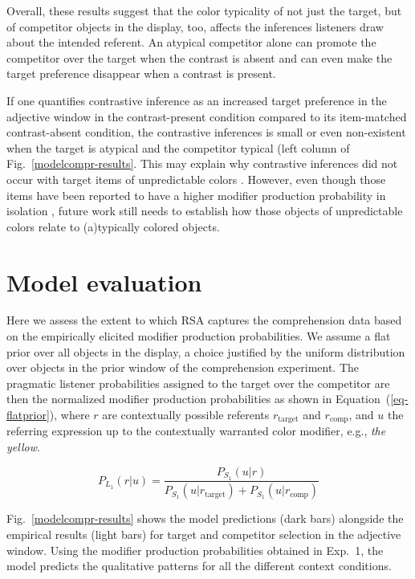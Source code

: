 \documentclass[10pt,letterpaper]{article}
\newcommand{\figref}[1]{Fig.~\ref{#1}}
\begin{document}
Overall, these results suggest that the color typicality of not just the target, but of competitor objects in the display, too, affects the inferences listeners draw about the intended referent. An atypical competitor alone can promote the competitor over the target when the contrast is absent and can even make the target preference disappear when a contrast is present. %

If one quantifies contrastive inference as an increased target preference in the adjective window in the contrast-present condition compared to its item-matched contrast-absent condition, the contrastive inferences is small or even non-existent when the target is atypical and the competitor typical (left column of \figref{modelcompr-results}. This may explain why contrastive inferences did not occur with target items of unpredictable colors \cite{Sedivy:2003}. However, even though those items have been reported to have a higher modifier production probability in isolation \cite{Sedivy:2003}, future work still needs to establish how those objects of unpredictable colors relate to (a)typically colored objects.

\section{Model evaluation}

Here we assess the extent to which RSA captures the comprehension data based on the empirically elicited modifier production probabilities. We assume a flat prior over all objects in the display, a choice justified by the uniform distribution over objects in the prior window of the comprehension experiment. The pragmatic listener probabilities assigned to the target over the competitor are then the normalized modifier production probabilities as shown in Equation~(\ref{eq-flatprior}), where $r$ are contextually possible referents $r_{\text{target}}$ and $r_{\text{comp}}$, and $u$ the referring expression up to the contextually warranted color modifier, e.g., \emph{the yellow}.

\begin{equation}
	P_{L_1}(r|u) = \frac{P_{S_1}(u|r)}{P_{S_1}(u|r_{\text{target}}) + P_{S_1}(u|r_{\text{comp}})}
\label{eq-flatprior}
\end{equation}

\figref{modelcompr-results} shows the model predictions (dark bars) alongside the empirical results (light bars) for target and competitor selection in the adjective window. Using the modifier production probabilities obtained in Exp.~1, the model predicts the qualitative patterns for all the different context conditions. 
\end{document}
